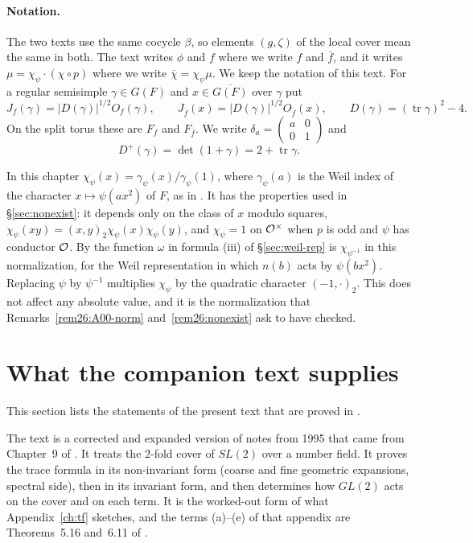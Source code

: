 \documentclass[12pt,letterpaper,openany]{book}
\theoremstyle{plain}
\theoremstyle{definition}
\theoremstyle{remark}
\theoremstyle{remark}
\newcommand{\tr}{\operatorname{tr}}
\begin{document}
\paragraph{Notation.} The two texts use the same cocycle $\beta$, so
elements $(g,\zeta)$ of the local cover mean the same in both. The text
\cite{JC} writes $\phi$ and $f$ where we write $f$ and $\overline f$, and
it writes $\mu=\chi_\psi\cdot(\chi\circ p)$ where we write
$\overline\chi=\chi_\psi\mu$. We keep the notation of this text. For a
regular semisimple $\gamma\in G(F)$ and $x\in\overline{G(F)}$ over
$\gamma$ put
\[
J_f(\gamma)=|D(\gamma)|^{1/2}O_f(\gamma),\qquad
J_{\overline f}(x)=|D(\gamma)|^{1/2}O_{\overline f}(x),\qquad
D(\gamma)=(\tr\gamma)^2-4 .
\]
On the split torus these are $F_f$ and $F_{\overline f}$. We write
$\delta_a=\left(\begin{smallmatrix}a&0\\0&1\end{smallmatrix}\right)$ and
\[
D^+(\gamma)=\det(1+\gamma)=2+\tr\gamma .
\]

In this chapter $\chi_\psi(x)=\gamma_\psi(x)/\gamma_\psi(1)$, where
$\gamma_\psi(a)$ is the Weil index of the character $x\mapsto\psi(ax^2)$
of $F$, as in \cite[Lemma~3.3]{JC}. It has the properties used in
\S\ref{sec:nonexist}: it depends only on the class of $x$ modulo squares,
$\chi_\psi(xy)=(x,y)_2\chi_\psi(x)\chi_\psi(y)$, and $\chi_\psi=1$ on
${\cal O}^\times$ when $p$ is odd and $\psi$ has conductor ${\cal O}$. By
\cite[Lemma~5.7]{JC} the function $\omega$ in formula (iii) of
\S\ref{sec:weil-rep} is $\chi_{\psi^{-1}}$ in this normalization, for the
Weil representation in which $n(b)$ acts by $\psi(bx^2)$. Replacing $\psi$
by $\psi^{-1}$ multiplies $\chi_\psi$ by the quadratic character
$(-1,\cdot)_2$. This does not affect any absolute value, and it is the
normalization that Remarks~\ref{rem26:A00-norm} and~\ref{rem26:nonexist}
ask to have checked.

\section{What the companion text supplies}\label{sec:cover-supplies}

This section lists the statements of the present text that are proved in
\cite{JC}.

The text \cite{JC} is a corrected and expanded version of notes from
1995 that came from Chapter~9 of \cite{J2}. It treats the 2-fold cover of
$SL(2)$ over a number field. It proves the trace formula in its
non-invariant form (coarse and fine geometric expansions, spectral side),
then in its invariant form, and then determines how $GL(2)$ acts on the
cover and on each term. It is the worked-out form of what
Appendix~\ref{ch:tf} sketches, and the terms (a)--(e) of that appendix
are Theorems~5.16 and~6.11 of \cite{JC}.
\end{document}

